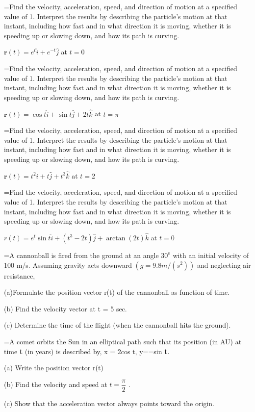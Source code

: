 \documentclass[11pt,a4paper]{article}
\newlength{\qw}\settowidth{\qw}{\textbf{888.}\ }
\newcommand{\q}[2]{%
  \Needspace{3\baselineskip}%
  \par\medskip\noindent\hangindent=\qw\hangafter=1\makebox[\qw][l]{\textbf{#1.}}#2\par}
\begin{document}
\q{592}{Find the velocity, acceleration, speed, and direction of motion at a specified value of 1. Interpret the results by describing the particle's motion at that instant, including how fast and in what direction it is moving, whether it is speeding up or slowing down, and how its path is curving.\par $\boldsymbol{r}(t)=e^{t}\hat{i}+e^{-t}\hat{j}$ at $t=0$}
\q{593}{Find the velocity, acceleration, speed, and direction of motion at a specified value of 1. Interpret the results by describing the particle's motion at that instant, including how fast and in what direction it is moving, whether it is speeding up or slowing down, and how its path is curving.\par $\boldsymbol{r}(t)=\cos t\hat{i}+\sin t\hat{j}+2t\hat{k}$ at $t=\pi$}
\q{594}{Find the velocity, acceleration, speed, and direction of motion at a specified value of 1. Interpret the results by describing the particle's motion at that instant, including how fast and in what direction it is moving, whether it is speeding up or slowing down, and how its path is curving.\par $\boldsymbol{r}(t)=t^{2}\hat{i}+t\hat{j}+t^{3}\hat{k}$ at $t=2$}
\q{595}{Find the velocity, acceleration, speed, and direction of motion at a specified value of 1. Interpret the results by describing the particle's motion at that instant, including how fast and in what direction it is moving, whether it is speeding up or slowing down, and how its path is curving.\par $r(t)=e^{t}\sin t\hat{i}+(t^{3}-2t)\hat{j}+\arctan(2t)\hat{k}$ at $t=0$}
\q{596}{A cannonball is fired from the ground at an angle $30^{o}$ with an initial velocity of 100 m/s. Assuming gravity acts downward $(g=9.8m/(s^{2}))$ and neglecting air resistance,\par (a)Formulate the position vector r(t) of the cannonball as function of time.\par (b) Find the velocity vector at t = 5 sec.\par (c) Determine the time of the flight (when the cannonball hits the ground).}
\q{597}{A comet orbits the Sun in an elliptical path such that its position (in AU) at time \textbf{t} (in years) is described by, x = 2cos t, y==sin \textbf{t}.\par (a) Write the position vector r(t)\par (b) Find the velocity and speed at $t=\dfrac{\pi}{2}$ .\par (c) Show that the acceleration vector always points toward the origin.}
\end{document}
